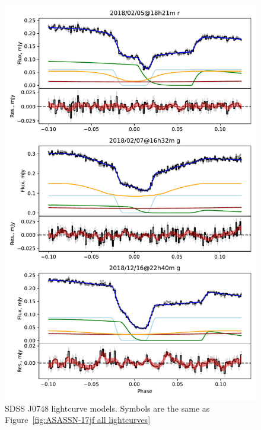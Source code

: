 \begin{figure}
    \centering
    \includegraphics[width=\textwidth]{figures/results/SDSS0748/SDSS0748_1.pdf}
    \caption{SDSS J0748 lightcurve models. Symbols are the same as Figure~\ref{fig:ASASSN-17jf all lightcurves}}
    \label{fig:SDSS J0748 all lightcurves}
\end{figure}
